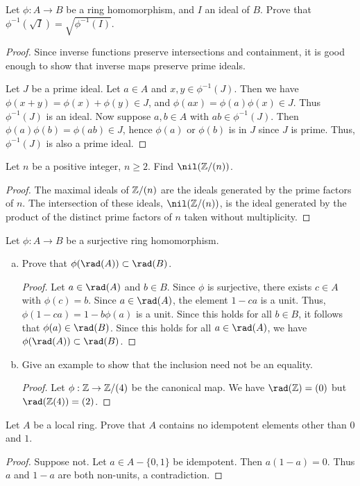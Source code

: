 \documentclass{article}
\begin{document}
 Let $\phi: A \to B$ be a ring homomorphism, and $I$ an ideal of $B$. Prove that $\phi^{-1}(\sqrt I) = \sqrt{\phi^{-1}(I)}$.

\begin{proof}

Since inverse functions preserve intersections and containment, it is good enough to show that inverse maps preserve prime ideals. 

Let $J$ be a prime ideal.  Let $a \in A$ and $x,y \in \phi^{-1}(J)$.  Then we have $\phi(x + y) = \phi(x) + \phi(y) \in J$, and $\phi(ax) = \phi(a)\phi(x) \in J$.  Thus $\phi^{-1}(J)$ is an ideal.   Now suppose $a,b \in A$ with $ab \in \phi^{-1}(J)$.  Then $\phi(a)\phi(b) = \phi(ab) \in J$,  hence $\phi(a)$ or $\phi(b)$ is in $J$ since $J$ is prime.  Thus, $\phi^{-1}(J)$ is also a prime ideal.
\end{proof}

 Let $n$ be a positive integer, $n \ge 2$. Find $\nil(\Z/(n))$.
\begin{proof}
The maximal ideals of $\mathbb{Z}/(n)$ are the ideals generated by the prime factors of $n$.  The intersection of these ideals, $\nil(\Z/(n))$,  is the ideal generated by the product of the distinct prime factors of $n$ taken without multiplicity.
\end{proof}

 Let $\phi: A \to B$ be a surjective ring homomorphism.
\begin{enumerate}[(a)]
\item Prove that $\phi(\rad(A)) \subset \rad(B)$.
\begin{proof}
Let $a \in \rad(A)$ and $b \in B$.  Since $\phi$ is surjective, there exists $c \in A$ with $\phi(c) = b$.  Since $a \in \rad(A)$, the element $1 - ca$ is a unit. Thus, $\phi(1 - ca) = 1 - b\phi(a)$ is a unit.  Since this holds for all $b \in B$, it follows that $\phi(a) \in \rad(B)$.  Since this holds for all $a \in \rad(A)$, we have $\phi(\rad(A)) \subset \rad(B)$.
\end{proof}
\item Give an example to show that the inclusion need not be an equality.
\begin{proof}
Let $\phi:\mathbb{Z} \to \mathbb{Z}/(4)$ be the canonical map.  We have $\rad(\Z) = (0)$ but $\rad(\Z(4)) = (2)$.
\end{proof}
\end{enumerate}

 Let $A$ be a local ring.  Prove that $A$ contains no idempotent elements other than $0$ and $1$.
\begin{proof}
Suppose not.  Let $a \in A - \{0,1\}$ be idempotent.  Then $a(1-a) = 0$.  Thus $a$ and $1-a$ are both non-units, a contradiction.
\end{proof}
\end{document}
